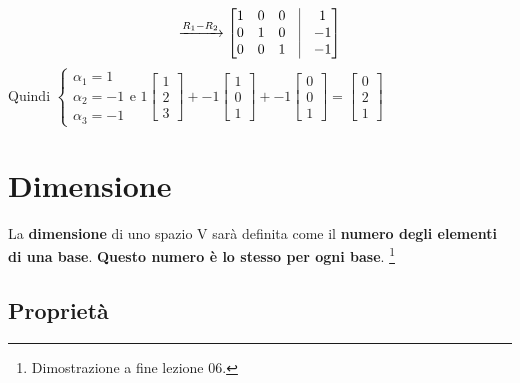 \documentclass[a4paper, 12pt]{report}
\begin{document}
                $$
                \xrightarrow[]{R_1-R_2}
                \begin{bmatrix}
                    1 & 0 & 0 & \vline & 1\\
                    0 & 1 & 0 & \vline & -1\\
                    0 & 0 & 1 & \vline & -1
                \end{bmatrix}
                $$
                Quindi 
                $
                \begin{cases}
                    \alpha_1=1\\
                    \alpha_2=-1\\
                    \alpha_3=-1
                \end{cases}
                \text{e }
                1
                \begin{bmatrix}
                    1\\
                    2\\
                    3
                \end{bmatrix}
                +-1
                \begin{bmatrix}
                    1\\
                    0\\
                    1
                \end{bmatrix}
                +-1
                \begin{bmatrix}
                    0\\
                    0\\
                    1
                \end{bmatrix}
                =
                \begin{bmatrix}
                    0\\
                    2\\
                    1
                \end{bmatrix}
                $
    \chapter{Dimensione}
        La \textbf{dimensione} di uno spazio V sarà definita come il \textbf{numero degli elementi di una base}. \textbf{Questo numero è lo stesso per ogni base}. \footnote{Dimostrazione a fine lezione 06.}
            \section{Proprietà}
\end{document}
